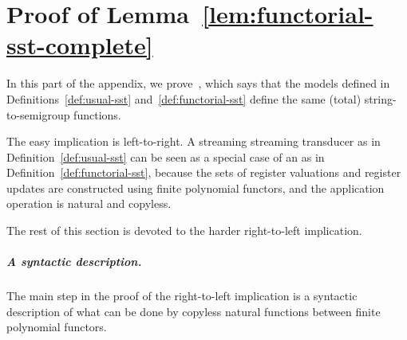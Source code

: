 \section{Proof of Lemma~\ref{lem:functorial-sst-complete}}
In this part of the appendix, we prove~, which says that the models defined in Definitions~\ref{def:usual-sst} and~\ref{def:functorial-sst} define the same (total) string-to-semigroup functions.

The easy implication is left-to-right. 
    A streaming streaming transducer as in Definition~\ref{def:usual-sst} can be seen as a special case of an \sst as in Definition~\ref{def:functorial-sst}, because the sets of register valuations and register updates are constructed using finite polynomial functors, and the application operation is natural and copyless. 

The rest of this section is devoted to the harder right-to-left implication. 

\subparagraph*{A syntactic description.} The main step in the proof of the right-to-left implication is a syntactic description of what can be done by copyless natural functions between finite polynomial functors.



